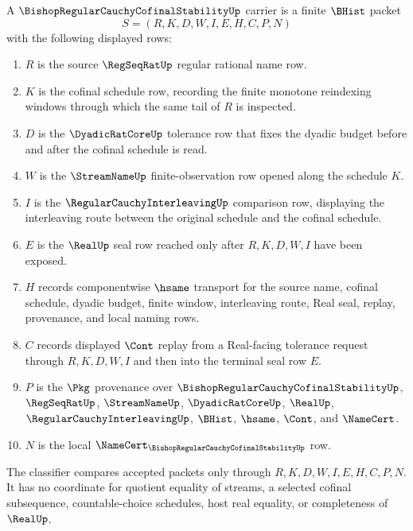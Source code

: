 \begin{definition}
\label{def:bishop-regular-cauchy-cofinal-stability-carrier}
A $\BishopRegularCauchyCofinalStabilityUp$ carrier is a finite $\BHist$ packet
$$
S=(R,K,D,W,I,E,H,C,P,N)
$$
with the following displayed rows:
\begin{enumerate}
\item $R$ is the source $\RegSeqRatUp$ regular rational name row.
\item $K$ is the cofinal schedule row, recording the finite monotone reindexing windows through which the same tail of $R$ is inspected.
\item $D$ is the $\DyadicRatCoreUp$ tolerance row that fixes the dyadic budget before and after the cofinal schedule is read.
\item $W$ is the $\StreamNameUp$ finite-observation row opened along the schedule $K$.
\item $I$ is the $\RegularCauchyInterleavingUp$ comparison row, displaying the interleaving route between the original schedule and the cofinal schedule.
\item $E$ is the $\RealUp$ seal row reached only after $R,K,D,W,I$ have been exposed.
\item $H$ records componentwise $\hsame$ transport for the source name, cofinal schedule, dyadic budget, finite window, interleaving route, Real seal, replay, provenance, and local naming rows.
\item $C$ records displayed $\Cont$ replay from a Real-facing tolerance request through $R,K,D,W,I$ and then into the terminal seal row $E$.
\item $P$ is the $\Pkg$ provenance over $\BishopRegularCauchyCofinalStabilityUp$, $\RegSeqRatUp$, $\StreamNameUp$, $\DyadicRatCoreUp$, $\RealUp$, $\RegularCauchyInterleavingUp$, $\BHist$, $\hsame$, $\Cont$, and $\NameCert$.
\item $N$ is the local $\NameCert_{\BishopRegularCauchyCofinalStabilityUp}$ row.
\end{enumerate}
The classifier compares accepted packets only through $R,K,D,W,I,E,H,C,P,N$. It has no coordinate for quotient equality of streams, a selected cofinal subsequence, countable-choice schedules, host real equality, or completeness of $\RealUp$.
\end{definition}

